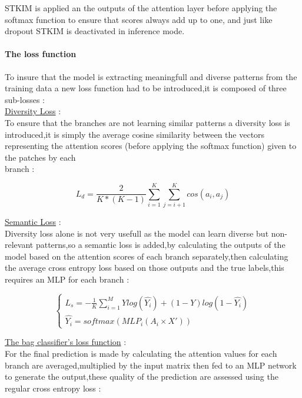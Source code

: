 \documentclass[
11pt, %
english, %
singlespacing, %
headsepline, %
]{project_structure}
\newcommand{\subpar}[1]{\paragraph*{#1}}
\begin{document}
\noindent \acrshort{STKIM} is applied an the outputs of the attention layer before applying the softmax function to ensure that scores always add up to one, and just like dropout \acrshort{STKIM} is deactivated in inference mode.

\newpage
\subpar{The loss function}

\noindent To insure that the model is extracting meaningfull and diverse patterns from the training data a new loss function had to be introduced,it is composed of three sub-losses : \\


\noindent \underline{Diversity Loss} : \\

\noindent To ensure that the branches are not learning similar patterns a diversity loss is introduced,it is simply the average cosine similarity between the vectors representing the attention scores (before applying the softmax function) given to the patches by each \\ branch :

$$
L_{d} = \frac{2}{K * (K - 1)} \sum\limits_{i=1}^{K} \sum\limits_{j=i+1}^{K} cos(a_{i},a_{j})
$$

\noindent \underline{Semantic Loss} : \\

\noindent Diversity loss alone is not very usefull as the model can learn diverse but non-relevant patterns,so a semantic loss is added,by calculating the outputs of the model based on the attention scores of each branch separately,then calculating the average cross entropy loss based on those outputs and the true labels,this requires an \acrshort{MLP} for each branch :

$$
\begin{cases}
    L_{s} = - \frac{1}{K} \sum\limits_{i=1}^{M} Y log(\hat{Y_{i}}) + (1 - Y) log(1 - \hat{Y_{i}})\\
    \hat{Y_{i}} = softmax(MLP_{i}(A_{i} \times X'))
\end{cases}
$$

\noindent \underline{The bag classifier's loss function} : \\

\noindent For the final prediction is made by calculating the attention values for each branch are averaged,multiplied by the input matrix then fed to an \acrshort{MLP} network to generate the output,these quality of the prediction are assessed using the regular cross entropy loss :
\end{document}
